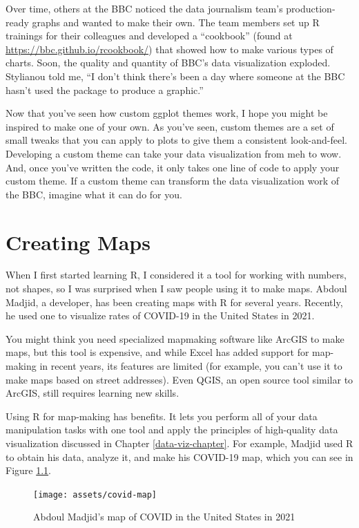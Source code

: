 \documentclass[
]{book}
\begin{document}
Over time, others at the BBC noticed the data journalism team's production-ready graphs and wanted to make their own. The team members set up R trainings for their colleagues and developed a ``cookbook'' (found at \url{https://bbc.github.io/rcookbook/}) that showed how to make various types of charts. Soon, the quality and quantity of BBC's data visualization exploded. Stylianou told me, ``I don't think there's been a day where someone at the BBC hasn't used the package to produce a graphic.''

Now that you've seen how custom ggplot themes work, I hope you might be inspired to make one of your own. As you've seen, custom themes are a set of small tweaks that you can apply to plots to give them a consistent look-and-feel. Developing a custom theme can take your data visualization from meh to wow. And, once you've written the code, it only takes one line of code to apply your custom theme. If a custom theme can transform the data visualization work of the BBC, imagine what it can do for you.

\hypertarget{maps-chapter}{%
\chapter{Creating Maps}\label{maps-chapter}}

When I first started learning R, I considered it a tool for working with numbers, not shapes, so I was surprised when I saw people using it to make maps. Abdoul Madjid, a developer, has been creating maps with R for several years. Recently, he used one to visualize rates of COVID-19 in the United States in 2021.

You might think you need specialized mapmaking software like ArcGIS to make maps, but this tool is expensive, and while Excel has added support for map-making in recent years, its features are limited (for example, you can't use it to make maps based on street addresses). Even QGIS, an open source tool similar to ArcGIS, still requires learning new skills.

Using R for map-making has benefits. It lets you perform all of your data manipulation tasks with one tool and apply the principles of high-quality data visualization discussed in Chapter \ref{data-viz-chapter}. For example, Madjid used R to obtain his data, analyze it, and make his COVID-19 map, which you can see in Figure \ref{fig:madjid-covid-map}.

\begin{figure}
\texttt{[image: assets/covid-map]} \caption{Abdoul Madjid's map of COVID in the United States in 2021}\label{fig:madjid-covid-map}
\end{figure}
\end{document}
